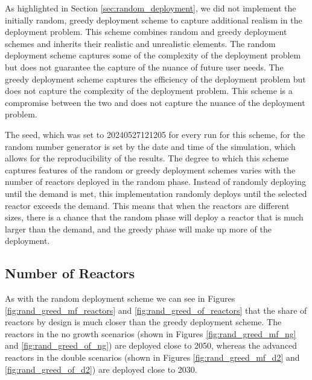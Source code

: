 As highlighted in Section \ref{sec:random_deployment}, we did not implement the
initially random, greedy deployment scheme to capture additional realism in the
deployment problem. This scheme combines random and greedy deployment schemes
and inherits their realistic and unrealistic elements. The random deployment
scheme captures some of the complexity of the deployment problem but does not
guarantee the capture of the nuance of future user needs. The greedy deployment
scheme captures the efficiency of the deployment problem but does not capture
the complexity of the deployment problem. This scheme is a compromise between
the two and does not capture the nuance of the deployment problem.

The seed, which was set to 20240527121205 for every run for this scheme, for
the random number generator is set by the date and time of the simulation,
which allows for the reproducibility of the results. The degree to which this
scheme captures features of the random or greedy deployment schemes varies with
the number of reactors deployed in the random phase. Instead of randomly
deploying until the demand is met, this implementation randomly deploys until
the selected reactor exceeds the demand. This means that when the reactors are
different sizes, there is a chance that the random phase will deploy a reactor
that is much larger than the demand, and the greedy phase will make up more of
the deployment.


\subsection{Number of Reactors}
\label{sec:rand_greed_reactors}

As with the random deployment scheme we can see in Figures
\ref{fig:rand_greed_mf_reactors} and \ref{fig:rand_greed_of_reactors} that the share of reactors by design is much closer than the greedy deployment scheme. The reactors in the no growth scenarios (shown in Figures \ref{fig:rand_greed_mf_ng} and \ref{fig:rand_greed_of_ng}) are deployed close to 2050, whereas the advanced reactors in the double scenarios (shown in Figures \ref{fig:rand_greed_mf_d2} and \ref{fig:rand_greed_of_d2}) are deployed close to 2030.

